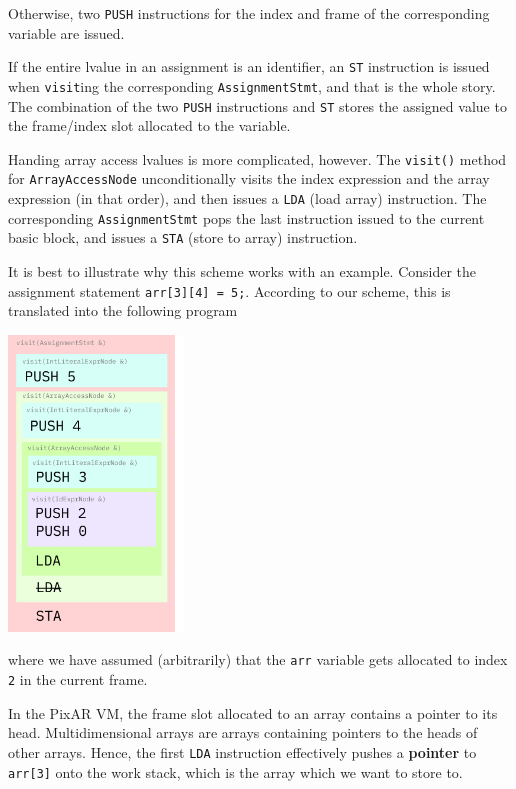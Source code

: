 \documentclass[11pt,a4paper]{scrartcl}
\begin{document}
Otherwise, two \verb|PUSH| instructions for the index and frame of the corresponding variable are issued.

If the entire lvalue in an assignment is an identifier, an \verb|ST| instruction is issued when \verb|visit|ing the corresponding \verb|AssignmentStmt|, and that is the whole story. The combination of the two \verb|PUSH| instructions and \verb|ST| stores the assigned value to the frame/index slot allocated to the variable.

Handing array access lvalues is more complicated, however. The \verb|visit()| method for \verb|ArrayAccessNode| unconditionally visits the index expression and the array expression (in that order), and then issues a \verb|LDA| (load array) instruction. The corresponding \verb|AssignmentStmt| pops the last instruction issued to the current basic block, and issues a \verb|STA| (store to array) instruction.

It is best to illustrate why this scheme works with an example. Consider the assignment statement \verb|arr[3][4] = 5;|. According to our scheme, this is translated into the following program

\begin{center}
  \includegraphics[width=0.35\textwidth]{lvalue_example}
\end{center}

where we have assumed (arbitrarily) that the \verb|arr| variable gets allocated to index \verb|2| in the current frame.

In the PixAR VM, the frame slot allocated to an array contains a pointer to its head. Multidimensional arrays are arrays containing pointers to the heads of other arrays. Hence, the first \verb|LDA| instruction effectively pushes a \textbf{pointer} to \verb|arr[3]| onto the work stack, which is the array which we want to store to.
\end{document}
